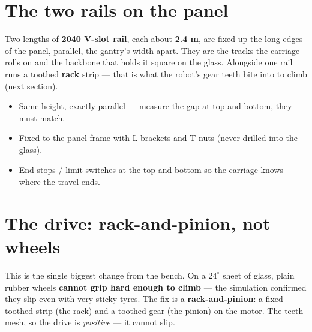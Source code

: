 \documentclass[11pt,a4paper]{article}
\begin{document}
\section{The two rails on the panel}

Two lengths of \textbf{2040 V-slot rail}, each about \textbf{2.4 m}, are fixed up the long edges of the
panel, parallel, the gantry's width apart. They are the tracks the carriage rolls on and the backbone
that holds it square on the glass. Alongside one rail runs a toothed \textbf{rack} strip --- that is what
the robot's gear teeth bite into to climb (next section).

\begin{itemize}[leftmargin=*,itemsep=1pt]
  \item Same height, exactly parallel --- measure the gap at top and bottom, they must match.
  \item Fixed to the panel frame with L-brackets and T-nuts (never drilled into the glass).
  \item End stops / limit switches at the top and bottom so the carriage knows where the travel ends.
\end{itemize}

\section{The drive: rack-and-pinion, not wheels}

This is the single biggest change from the bench. On a $24^{\circ}$ sheet of glass, plain rubber wheels
\textbf{cannot grip hard enough to climb} --- the simulation confirmed they slip even with very sticky
tyres. The fix is a \textbf{rack-and-pinion}: a fixed toothed strip (the rack) and a toothed gear (the
pinion) on the motor. The teeth mesh, so the drive is \emph{positive} --- it cannot slip.
\end{document}
